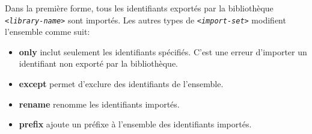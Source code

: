 Dans la première forme, tous les identifiants exportés par
la bibliothèque \texttt{\textit{<library-name>}} sont importés.
Les autres types de \texttt{\textit{<import-set>}} modifient
l'ensemble comme suit:
\begin{itemize}
  \item \textbf{only} inclut seulement les identifiants spécifiés. C'est une
    erreur d'importer un identifiant non exporté par la bibliothèque.

  \item \textbf{except} permet d'exclure des identifiants de l'ensemble.

  \item \textbf{rename} renomme les identifiants importés.

  \item \textbf{prefix} ajoute un préfixe à l'ensemble des identifiants
    importés.
\end{itemize}


